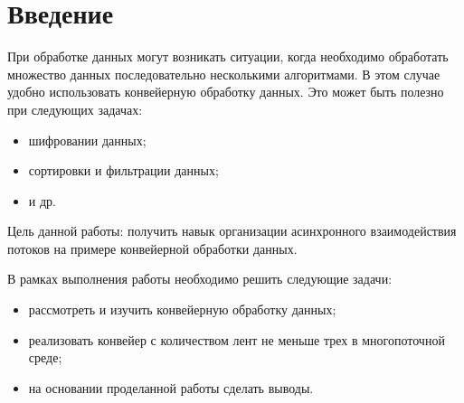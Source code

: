 \chapter*{Введение}

При обработке данных могут возникать ситуации, когда необходимо обработать множество данных последовательно несколькими алгоритмами. В этом случае удобно использовать конвейерную обработку данных. Это может быть полезно при следующих задачах:
\begin{itemize}
	\item шифровании данных;
	\item сортировки и фильтрации данных;
	\item и др.
\end{itemize}

Цель данной работы: получить навык организации асинхронного взаимодействия потоков на примере конвейерной обработки данных.

В рамках выполнения работы необходимо решить следующие задачи:
\begin{itemize}
	\item рассмотреть и изучить конвейерную обработку данных;
	\item реализовать конвейер с количеством лент не меньше трех в многопоточной среде;
	\item на основании проделанной работы сделать выводы.
\end{itemize}
